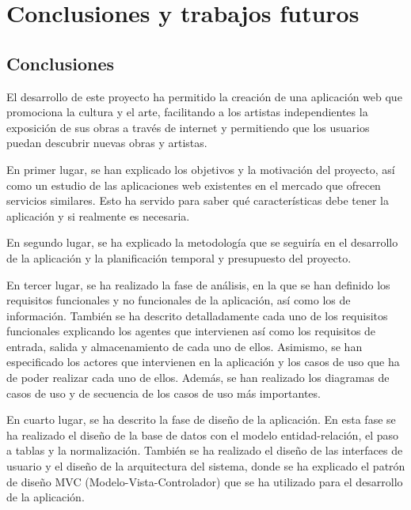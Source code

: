 \chapter{Conclusiones y trabajos futuros}

\section{Conclusiones}

El desarrollo de este proyecto ha permitido la creación de una aplicación web que promociona
la cultura y el arte, facilitando a los artistas independientes la exposición de sus obras a
través de internet y permitiendo que los usuarios puedan descubrir nuevas obras y artistas.

\vspace{0.5cm}

En primer lugar, se han explicado los objetivos y la motivación del proyecto, así como un
estudio de las aplicaciones web existentes en el mercado que ofrecen servicios similares.
Esto ha servido para saber qué características debe tener la aplicación y si realmente
es necesaria.

\vspace{0.5cm}

En segundo lugar, se ha explicado la metodología que se seguiría en el desarrollo de la
aplicación y la planificación temporal y presupuesto del proyecto.

\vspace{0.5cm}

En tercer lugar, se ha realizado la fase de análisis, en la que se han definido los
requisitos funcionales y no funcionales de la aplicación, así como los de información.
También se ha descrito detalladamente cada uno de los requisitos funcionales explicando
los agentes que intervienen así como los requisitos de entrada, salida y almacenamiento
de cada uno de ellos. Asimismo, se han especificado los actores que intervienen en la
aplicación y los casos de uso que ha de poder realizar cada uno de ellos. Además, se han
realizado los diagramas de casos de uso y de secuencia de los casos de uso más
importantes.

\vspace{0.5cm}

En cuarto lugar, se ha descrito la fase de diseño de la aplicación. En esta fase se ha
realizado el diseño de la base de datos con el modelo entidad-relación, el paso a tablas
y la normalización. También se ha realizado el diseño de las interfaces de usuario y el
diseño de la arquitectura del sistema, donde se ha explicado el patrón de diseño MVC
(Modelo-Vista-Controlador) que se ha utilizado para el desarrollo de la aplicación.


